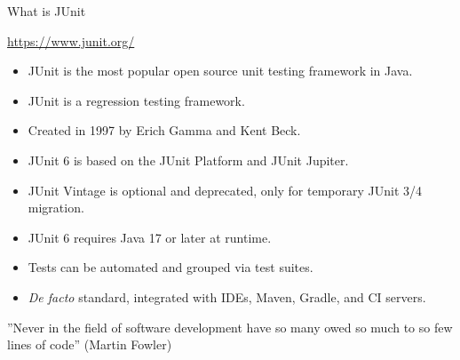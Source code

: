\documentclass[11pt, xcolor=svgnames]{beamer}
\begin{document}
\begin{frame}{What is JUnit}

\begin{block}{}
  \centering \url{https://www.junit.org/}
\end{block}

\begin{itemize}
    \item JUnit is the most popular open source unit testing framework in Java.
  \item JUnit is a regression testing framework.
    \item Created in 1997 by Erich Gamma and Kent Beck.
  \item JUnit 6 is based on the JUnit Platform and JUnit Jupiter.
  \item JUnit Vintage is optional and deprecated, only for temporary JUnit 3/4 migration.
  \item JUnit 6 requires Java 17 or later at runtime.
  \item Tests can be automated and grouped via test suites.
  \item \textit{De facto} standard, integrated with IDEs, Maven, Gradle, and CI servers.
\end{itemize}




\begin{block}{}
  ''Never in the field of software development have so many owed so much to so few lines of code'' (Martin Fowler)
\end{block}

\end{frame}


\end{document}
